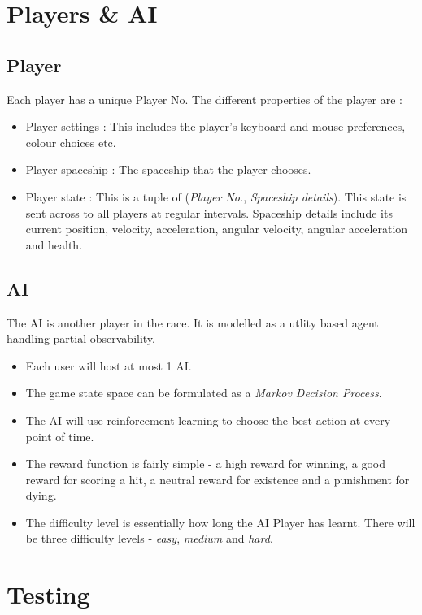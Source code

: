 \documentclass[]{article}
\begin{document}
\section{Players \& AI}
\subsection{Player}
Each player has a unique Player No. The different properties of the player are : 
\begin{itemize}
\item Player settings : This includes the player's keyboard and mouse preferences, colour choices etc.
\item Player spaceship : The spaceship that the player chooses.
\item Player state : This is a tuple of (\emph{Player No.}, \emph{Spaceship details}). This state is sent across to all players at regular intervals. Spaceship details include its current position, velocity, acceleration, angular velocity, angular acceleration and health.
\end{itemize}

\subsection{AI}
The AI is another player in the race. It is modelled as a utlity based agent handling partial observability.
\begin{itemize}
\item Each user will host at most 1 AI. 
\item The game state space can be formulated as a \emph{Markov Decision Process}. 
\item The AI will use reinforcement learning to choose the best action at every point of time. 
\item The reward function is fairly simple - a high reward for winning, a good reward for scoring a hit, a neutral reward for existence and a punishment for dying.
\item The difficulty level is essentially how long the AI Player has learnt. There will be three difficulty levels - \emph{easy}, \emph{medium} and \emph{hard}.
\end{itemize} 
\section{Testing}
\end{document}
